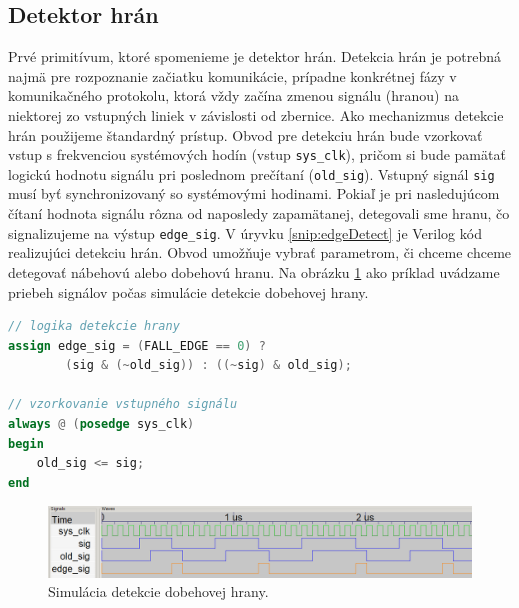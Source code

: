 \subsection{Detektor hrán} \label{subsek:edgeDetector}
Prvé primitívum, ktoré spomenieme je detektor hrán. Detekcia hrán je potrebná najmä pre rozpoznanie začiatku komunikácie, prípadne konkrétnej fázy v komunikačného protokolu, ktorá vždy začína zmenou signálu (hranou) na niektorej zo vstupných liniek v závislosti od zbernice. Ako mechanizmus detekcie hrán použijeme štandardný prístup. Obvod pre detekciu hrán bude vzorkovať vstup s frekvenciou systémových hodín (vstup \texttt{sys\_clk}), pričom si bude pamätať logickú hodnotu signálu pri poslednom prečítaní (\texttt{old\_sig}). Vstupný signál \texttt{sig} musí byť synchronizovaný so systémovými hodinami. Pokiaľ je pri nasledujúcom čítaní hodnota signálu rôzna od naposledy zapamätanej, detegovali sme hranu, čo signalizujeme na výstup \texttt{edge\_sig}. V úryvku \ref{snip:edgeDetect} je Verilog kód realizujúci detekciu hrán. Obvod umožňuje vybrať parametrom, či chceme chceme detegovať nábehovú alebo dobehovú hranu. Na obrázku \ref{obr:edgeDetectSim} ako príklad uvádzame priebeh signálov počas simulácie detekcie dobehovej hrany.

\begin{lstlisting}[float,language=Verilog,caption={Verilog kód pre detekciu hrán. Parameter \texttt{FALL\_EDGE} určuje, či detegujeme dobehovú alebo nábehovú hranu.},label=snip:edgeDetect]
// logika detekcie hrany
assign edge_sig = (FALL_EDGE == 0) ?
        (sig & (~old_sig)) : ((~sig) & old_sig);

// vzorkovanie vstupného signálu
always @ (posedge sys_clk)
begin
    old_sig <= sig;
end
\end{lstlisting}

\begin{figure}
    \centerline{\includegraphics[width=1\textwidth]{images/simulations/edgeDetectSim.png}}
    \caption[Simulácia detekcie dobehovej hrany]{Simulácia detekcie dobehovej hrany.}
    \label{obr:edgeDetectSim}
\end{figure}

